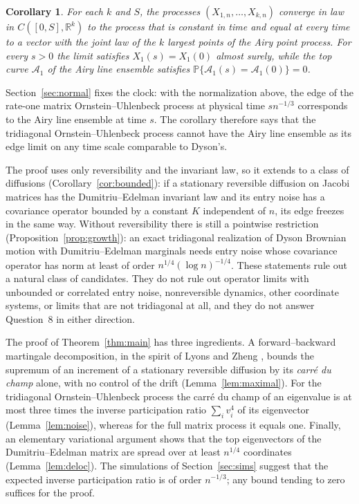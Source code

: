 \documentclass[11pt]{amsart}
\newtheorem{corollary}[theorem]{Corollary}
\theoremstyle{remark}
\newcommand{\PP}{\mathbb{P}}
\newcommand{\RR}{\mathbb{R}}
\begin{document}
\begin{corollary}\label{cor:frozen}
For each $k$ and $S$, the processes $(X_{1,n},\dots,X_{k,n})$ converge in law in $C([0,S],\RR^k)$ to the process that is
constant in time and equal at every time to a vector with the joint law of the $k$ largest points of the Airy point process.
For every $s>0$ the limit satisfies $X_1(s)=X_1(0)$ almost surely, while the top curve $\mathcal A_1$ of the Airy line
ensemble satisfies $\PP\{\mathcal A_1(s)=\mathcal A_1(0)\}=0$.
\end{corollary}

Section~\ref{sec:normal} fixes the clock: with the normalization above, the edge of the rate-one matrix
Ornstein--Uhlenbeck process at physical time $sn^{-1/3}$ corresponds to the Airy line ensemble at time $s$. The
corollary therefore says that the tridiagonal Ornstein--Uhlenbeck process cannot have the Airy line ensemble as its edge
limit on any time scale comparable to Dyson's.

The proof uses only reversibility and the invariant law, so it extends to a class of diffusions
(Corollary~\ref{cor:bounded}): if a stationary reversible diffusion on Jacobi matrices has the Dumitriu--Edelman
invariant law and its entry noise has a covariance operator bounded by a constant $K$ independent of $n$, its edge
freezes in the same way. Without reversibility there is still a pointwise restriction
(Proposition~\ref{prop:growth}): an exact tridiagonal realization of Dyson Brownian motion with Dumitriu--Edelman
marginals needs entry noise whose covariance operator has norm at least of order $n^{1/4}(\log n)^{-1/4}$. These
statements rule out a natural class of candidates. They do not rule out operator limits with unbounded or correlated
entry noise, nonreversible dynamics, other coordinate systems, or limits that are not tridiagonal at all, and they do
not answer Question~8 in either direction.

The proof of Theorem~\ref{thm:main} has three ingredients. A forward--backward martingale decomposition, in the spirit
of Lyons and Zheng \cite{LZ88}, bounds the supremum of an increment of a stationary reversible diffusion by its
\emph{carr\'e du champ} alone, with no control of the drift (Lemma~\ref{lem:maximal}). For the tridiagonal
Ornstein--Uhlenbeck process the carr\'e du champ of an eigenvalue is at most three times the inverse participation
ratio $\sum_i v_i^4$ of its eigenvector (Lemma~\ref{lem:noise}), whereas for the full matrix process it equals one.
Finally, an elementary variational argument shows that the top eigenvectors of the Dumitriu--Edelman matrix are spread
over at least $n^{1/4}$ coordinates (Lemma~\ref{lem:deloc}). The simulations of Section~\ref{sec:sims} suggest that
the expected inverse participation ratio is of order $n^{-1/3}$; any bound tending to zero suffices for the proof.
\end{document}
